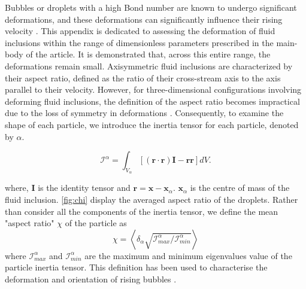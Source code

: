 \documentclass[12pt]{My_preprint}
\newcommand{\avg}[1]{\left<#1\right>}
\renewcommand{\avg}[1]{\left<#1\right>}
\newcommand{\pavg}[1]{\avg{\delta_\alpha #1}}
\renewcommand{\ref}[1]{\autoref{#1}}
\begin{document}
Bubbles or droplets with a high Bond number are known to undergo significant deformations, and these deformations can significantly influence their rising velocity \citep{bunner2003effect,tripathi2014}. This appendix is dedicated to assessing the deformation of fluid inclusions within the range of dimensionless parameters prescribed in the main-body of the article. It is demonstrated that, across this entire range, the deformations remain small. Axisymmetric fluid inclusions are characterized by their aspect ratio, defined as the ratio of their cross-stream axis to the axis parallel to their velocity. However, for three-dimensional configurations involving deforming fluid inclusions, the definition of the aspect ratio becomes impractical due to the loss of symmetry in deformations \citep{bunner2003effect}. Consequently, to examine the shape of each particle, we introduce the inertia tensor for each particle, denoted by $\alpha$.




\begin{equation*}
    \mathcal{I}^\alpha
    = \int_{V_\alpha} \left[
        (\textbf{r}\cdot \textbf{r}) \textbf{I}  - \textbf{rr}
        \right]
    dV.
\end{equation*}

where, \textbf{I} is the identity tensor and $\textbf{r} = \textbf{x} - \textbf{x}_\alpha$. $\textbf{x}_\alpha$ is the centre of mass of the fluid inclusion. \ref{fig:chi} display the averaged aspect ratio of the droplets. Rather than consider all the components of the inertia tensor, we define the mean "aspect ratio" $\chi$ of the particle as 
\begin{equation}
    \chi = \pavg{\sqrt{\mathcal{I}_{max}^\alpha /\mathcal{I}_{min}^\alpha} }
\end{equation} 
where $\mathcal{I}_{max}^\alpha$ and $\mathcal{I}_{min}^\alpha$ are the maximum and minimum eigenvalues value of the particle inertia tensor. This definition has been used to characterise the deformation and orientation of rising bubbles \citep{bunner2003effect}. 
\end{document}
